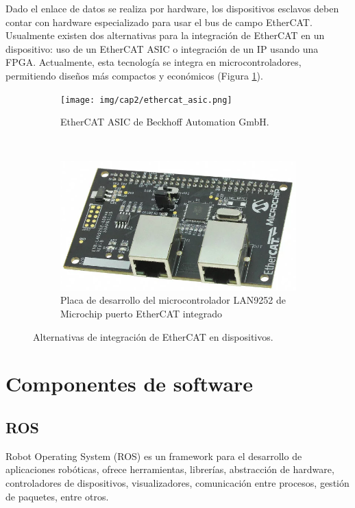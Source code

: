 Dado el enlace de datos se realiza por hardware, los dispositivos esclavos deben contar con hardware especializado para usar el bus de campo EtherCAT. Usualmente existen dos alternativas para la integración de EtherCAT en un dispositivo: uso de un EtherCAT ASIC o integración de un IP usando una FPGA. Actualmente, esta tecnología se integra en microcontroladores, permitiendo diseños más compactos y económicos (Figura \ref{cap2_ethercat}).

\begin{figure}[H]
  \centering
  \begin{subfigure}[b]{0.4\textwidth}
    \texttt{[image: img/cap2/ethercat\_asic.png]}
    \caption{EtherCAT ASIC de Beckhoff Automation GmbH.}
    \end{subfigure}%
    ~
  \begin{subfigure}[b]{0.4\textwidth}
    \includegraphics[width=\textwidth]{img/cap2/microchip_lan9252}
    \caption{Placa de desarrollo del microcontrolador LAN9252 de Microchip puerto EtherCAT integrado}
    \end{subfigure}
  \caption{Alternativas de integración de EtherCAT en dispositivos.}
  \label{cap2_ethercat}
\end{figure}

\section{Componentes de software}

\subsection{ROS}

Robot Operating System (ROS) \cite{quigley2009} es un  framework para el desarrollo de aplicaciones robóticas, ofrece herramientas, librerías, abstracción de hardware, controladores de dispositivos, visualizadores, comunicación entre procesos, gestión de paquetes, entre otros.

